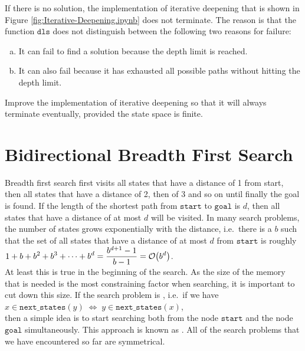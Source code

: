 \exercise
If there is no solution, the implementation of iterative deepening that is shown in Figure
\ref{fig:Iterative-Deepening.ipynb} does not terminate.  The reason is that the function $\texttt{dls}$ does not
distinguish between the following two reasons for failure:
\begin{enumerate}[(a)]
\item It can fail to find a solution because the depth limit is reached.
\item It can also fail because it has exhausted all possible paths without hitting the depth limit.
\end{enumerate}
Improve the implementation of iterative deepening so that it will always terminate eventually, provided the
state space is finite.
\eoxs


\section{Bidirectional Breadth First Search}
Breadth first search first visits all states that have a distance of 1 from start, then all
states that have a distance of 2, then of 3 and so on until finally the goal is found.  If the length of the shortest path
from $\texttt{start}$ to $\texttt{goal}$ is $d$, then all states that have a distance of at most $d$ will be
visited.  In many search problems, the number of states grows exponentially with the distance, i.e.~there is
a  $b$ 
such that the set of all states that have a distance of at most $d$
from $\texttt{start}$ is roughly
\\[0.2cm]
\hspace*{1.3cm}
 $\displaystyle 1 + b + b^2 + b^3 + \cdots + b^d = \frac{b^{d+1} - 1}{b - 1} = \mathcal{O}\bigl(b^d\bigr)$.
\\[0.2cm]
At least this is true in the beginning of the search.  As the size of
the memory that is needed is the most constraining factor when searching, it is important to cut down this
size.  If the search problem is , i.e.~if we have
\\[0.2cm]
\hspace*{1.3cm}
$x \in \mathtt{next\_states}(y) \;\Leftrightarrow\; y \in \mathtt{next\_states}(x)$,
\\[0.2cm]
then a simple idea is to start searching both from the node $\texttt{start}$ and the node $\texttt{goal}$
simultaneously.  This approach is known as .  
All of the search problems that we have encountered so far are symmetrical.

